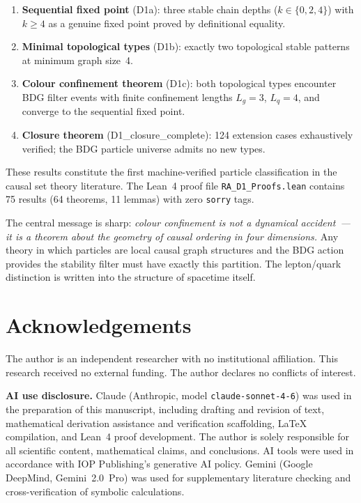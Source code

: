 \documentclass[11pt,a4paper]{article}
\begin{document}
\begin{enumerate}
  \item \textbf{Sequential fixed point} (D1a): three stable chain depths
    ($k \in \{0,2,4\}$) with $k \geq 4$ as a genuine fixed point proved
    by definitional equality.
  \item \textbf{Minimal topological types} (D1b): exactly two topological
    stable patterns at minimum graph size~4.
  \item \textbf{Colour confinement theorem} (D1c): both topological types
    encounter BDG filter events with finite confinement lengths $L_g=3$,
    $L_q=4$, and converge to the sequential fixed point.
  \item \textbf{Closure theorem} (D1\_closure\_complete): 124 extension
    cases exhaustively verified; the BDG particle universe admits no new
    types.
\end{enumerate}

These results constitute the first machine-verified particle classification
in the causal set theory literature. The Lean~4 proof file
\texttt{RA\_D1\_Proofs.lean} contains 75 results (64 theorems, 11 lemmas)
with zero \texttt{sorry} tags.

The central message is sharp: \emph{colour confinement is not a dynamical
accident~--- it is a theorem about the geometry of causal ordering in four
dimensions.} Any theory in which particles are local causal graph structures
and the BDG action provides the stability filter must have exactly this
partition. The lepton/quark distinction is written into the structure of
spacetime itself.



\medskip


\section*{Acknowledgements}

The author is an independent researcher with no institutional affiliation.
This research received no external funding.
The author declares no conflicts of interest.

\smallskip\noindent
\textbf{AI use disclosure.}
Claude (Anthropic, model \texttt{claude-sonnet-4-6}) was used in the
preparation of this manuscript, including drafting and revision of text,
mathematical derivation assistance and verification scaffolding,
\LaTeX{} compilation, and Lean~4 proof development.
The author is solely responsible for all scientific content,
mathematical claims, and conclusions.
AI tools were used in accordance with IOP Publishing's generative AI policy.
Gemini (Google DeepMind, Gemini~2.0~Pro) was used for supplementary
literature checking and cross-verification of symbolic calculations.
\end{document}
